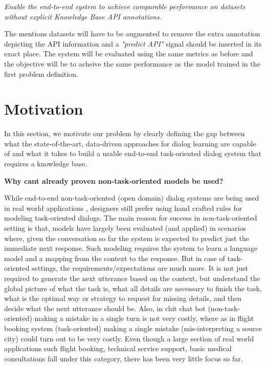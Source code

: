  {\em Enable the end-to-end system to achieve comparable performance on datasets without explicit Knowledge Base API annotations.}

The mentions datasets will have to be augmented to remove the extra annotation depicting the API information and a {\em"predict API"} signal should be inserted in its exact place. The system will be evaluated using the same metrics as before and the objective will be to acheive the same performance as the model trained in the first problem definition.


\section{Motivation}
In this section, we motivate our problem by clearly defining the gap between what the state-of-the-art, data-driven approaches for dialog learning are capable of and what it takes to build a usable end-to-end task-oriented dialog system that requires a knowledge base.

\noindent \textbf{Why cant already proven non-task-oriented models be used?}

While end-to-end non-task-oriented (open domain) dialog systems are being used in real world applications \cite{smartreply}, designers still prefer using hand crafted rules for modeling task-oriented dialogs. The main reason for success in non-task-oriented setting is that, models have largely been evaluated (and applied) in scenarios where, given the conversation so far the system is expected to predict just the immediate next response. Such modeling requires the system to learn a language model and a mapping from the context to the response. But in case of task-oriented settings, the requirements/expectations are much more. It is not just required to generate the next utterance based on the context, but understand the global picture of what the task is, what all details are necessary to finish the task, what is the optimal way or strategy to request for missing details, and then decide what the next utterance should be. Also, in chit chat bot (non-task-oriented) making a mistake in a single turn is not very costly, where as in flight booking system (task-oriented) making a single mistake (mis-interpreting a source city) could turn out to be very costly. Even though a large section of real world applications such flight booking, technical service support, basic medical consultations fall under this category, there has been very little focus so far.

